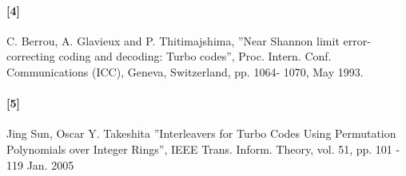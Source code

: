 \documentclass[20 pts]{article}
\begin{document}
\paragraph{[4]}  C. Berrou, A. Glavieux and P. Thitimajshima, ''Near Shannon limit error-correcting coding and
decoding: Turbo codes'', Proc. Intern. Conf. Communications (ICC), Geneva, Switzerland, pp. 1064-
1070, May 1993. \\
\paragraph{[5]}  Jing Sun, Oscar Y. Takeshita ''Interleavers for Turbo Codes Using Permutation Polynomials over Integer Rings'', IEEE Trans. Inform. Theory, vol. 51, pp. 101 - 119  Jan. 2005\\
\end{document}
